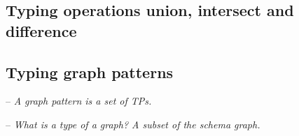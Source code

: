 \documentclass[runningheads]{llncs}
\newcommand{\notes}[1]{\noindent\begin{small}-- \emph{#1}\\\end{small}}
\begin{document}
\subsection{Typing operations union, intersect and difference}

\subsection{Typing graph patterns}

\noindent
\notes{A graph pattern is a set of TPs.}
\notes{What is a type of a graph? A subset of the schema graph.}







%



\end{document}
